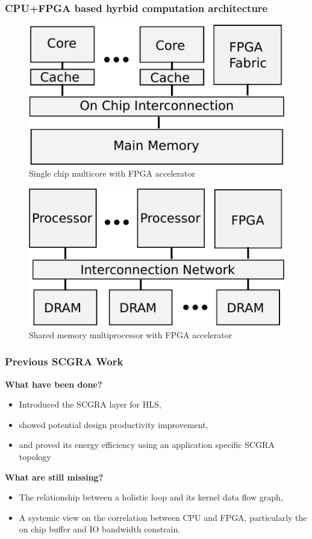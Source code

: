 \documentclass{beamer}
\begin{document}
\begin{frame}[t]
\frametitle{CPU+FPGA based hyrbid computation architecture}

\begin{figure}
\includegraphics[width=0.5\linewidth]{system-context}
\vspace{-1em}
\caption{Single chip multicore with FPGA accelerator}
\end{figure}

\begin{figure}
\includegraphics[width=0.5\linewidth]{system-context2}
\vspace{-1em}
\caption{Shared memory multiprocessor with FPGA accelerator}
\end{figure}

\end{frame}

\begin{frame}[t]
\frametitle{Previous SCGRA Work}
\textbf{What have been done?}
\begin{itemize}
\item Introduced the SCGRA layer for HLS,
\item showed potential design productivity improvement,
\item and proved its energy efficiency using an application specific SCGRA topology
\end{itemize}
\textbf{What are still missing?}
\begin{itemize}
\item The relationship between a holistic loop and its kernel data flow graph,
\item A systemic view on the correlation between CPU and FPGA, particularly the on chip buffer and IO
bandwidth constrain.
\end{itemize}
\end{frame}
\end{document}
